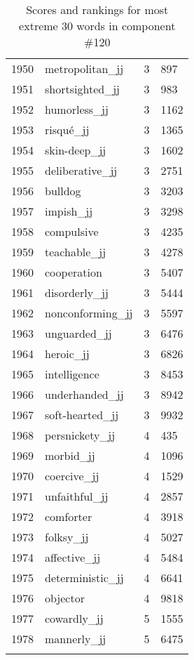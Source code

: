 \begin{longtable}[!htbp]{| rlr@{.}l |}
    1950 & metropolitan\_jj & 3 & 897 \\
    1951 & shortsighted\_jj & 3 & 983 \\
    1952 & humorless\_jj & 3 & 1162 \\
    1953 & risqué\_jj & 3 & 1365 \\
    1954 & skin-deep\_jj & 3 & 1602 \\
    1955 & deliberative\_jj & 3 & 2751 \\
    1956 & bulldog & 3 & 3203 \\
    1957 & impish\_jj & 3 & 3298 \\
    1958 & compulsive & 3 & 4235 \\
    1959 & teachable\_jj & 3 & 4278 \\
    1960 & cooperation & 3 & 5407 \\
    1961 & disorderly\_jj & 3 & 5444 \\
    1962 & nonconforming\_jj & 3 & 5597 \\
    1963 & unguarded\_jj & 3 & 6476 \\
    1964 & heroic\_jj & 3 & 6826 \\
    1965 & intelligence & 3 & 8453 \\
    1966 & underhanded\_jj & 3 & 8942 \\
    1967 & soft-hearted\_jj & 3 & 9932 \\
    1968 & persnickety\_jj & 4 & 435 \\
    1969 & morbid\_jj & 4 & 1096 \\
    1970 & coercive\_jj & 4 & 1529 \\
    1971 & unfaithful\_jj & 4 & 2857 \\
    1972 & comforter & 4 & 3918 \\
    1973 & folksy\_jj & 4 & 5027 \\
    1974 & affective\_jj & 4 & 5484 \\
    1975 & deterministic\_jj & 4 & 6641 \\
    1976 & objector & 4 & 9818 \\
    1977 & cowardly\_jj & 5 & 1555 \\
    1978 & mannerly\_jj & 5 & 6475 \\
    \hline
    \caption{Scores and rankings for most extreme 30 words in component \#120} \\
\end{longtable}
